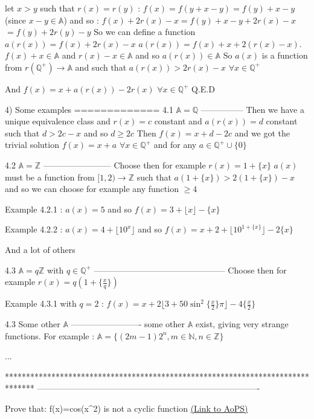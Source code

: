 \begin{solution}
let $x>y$ such that $r(x)=r(y)$ : $f(x)=f(y+x-y)=f(y)+x-y$ (since $x-y\in\mathbb A$) and so :
$f(x)+2r(x)-x=f(y)+x-y+2r(x)-x$ $=f(y)+2r(y)-y$
So we can define a function $a(r(x))=f(x)+2r(x)-x$
$a(r(x))=f(x)+x+2(r(x)-x)$. $f(x)+x\in\mathbb A$ and $r(x)-x\in\mathbb A$ and so $a(r(x))\in\mathbb A$
So $a(x)$ is a function from $r(\mathbb Q^+)\to \mathbb A$ and such that $a(r(x))>2r(x)-x$ $\forall x\in\mathbb Q^+$ 

And $f(x)=x+a(r(x))-2r(x)$ $\forall x\in\mathbb Q^+$
Q.E.D

4) Some examples
=============
4.1 $\mathbb A=\mathbb Q$
---------------
Then we have a unique equivalence class and $r(x)=c$ constant and $a(r(x))=d$ constant such that $d>2c-x$ and so $d\ge 2c$
Then $f(x)=x+d-2c$ and we got the trivial solution $\boxed{f(x)=x+a}$ $\forall x\in\mathbb Q^+$ and for any $a\in\mathbb Q^+\cup\{0\}$

4.2 $\mathbb A=\mathbb Z$
------------------------
Choose then for example $r(x)=1+\{x\}$
$a(x)$ must be a function from $[1,2)\to\mathbb Z$ such that $a(1+\{x\})>2(1+\{x\})-x$ and so we can choose for example any function $\ge 
4$

Example 4.2.1 : $a(x)=5$ and so $\boxed{f(x)=3+\lfloor x\rfloor-\{x\}}$

Example 4.2.2 : $a(x)=4+\lfloor 10^x\rfloor$ and so $\boxed{f(x)=x+2+\lfloor 10^{1+\{x\}}\rfloor-2\{x\}}$

And a lot of others

4.3 $\mathbb A=q\mathbb Z$ with $q\in\mathbb Q^+$
-----------------------------------------------
Choose then for example $r(x)=q(1+\{\frac xq\})$

Example 4.3.1 with $q=2$ : $\boxed{f(x)=x+2\lfloor3+50\sin^2 \{\frac x2\}\pi \rfloor-4\{\frac x2\}}$

4.3 Some other $\mathbb A$
-------------------------
some other $\mathbb A$ exist, giving very strange functions. For example : $\mathbb A=\{(2m-1)2^n, m\in\mathbb N,n\in\mathbb Z\}$

...
\end{solution}
*******************************************************************************
-------------------------------------------------------------------------------

\begin{problem}
	Prove that: f(x)=cos(x^2) is not a cyclic function
	\flushright \href{https://artofproblemsolving.com/community/c6h529727}{(Link to AoPS)}
\end{problem}



